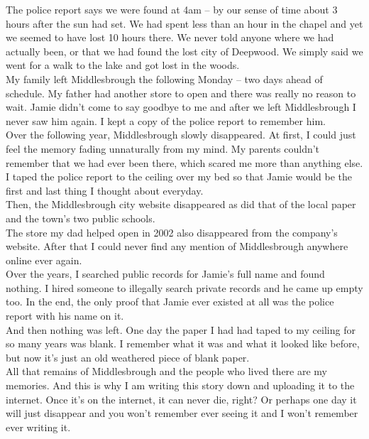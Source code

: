 \documentclass[a5paper]{scrartcl}
\begin{document}
The police report says we were found at 4am – by our sense of time about 3 hours after the sun had set. We had spent less than an hour in the chapel and yet we seemed to have lost 10 hours there. We never told anyone where we had actually been, or that we had found the lost city of Deepwood. We simply said we went for a walk to the lake and got lost in the woods. \\


My family left Middlesbrough the following Monday – two days ahead of schedule. My father had another store to open and there was really no reason to wait. Jamie didn't come to say goodbye to me and after we left Middlesbrough I never saw him again. I kept a copy of the police report to remember him.\\


Over the following year, Middlesbrough slowly disappeared. At first, I could just feel the memory fading unnaturally from my mind. My parents couldn't remember that we had ever been there, which scared me more than anything else. I taped the police report to the ceiling over my bed so that Jamie would be the first and last thing I thought about everyday.  \\


Then, the Middlesbrough city website disappeared as did that of the local paper and the town's two public schools.\\


The store my dad helped open in 2002 also disappeared from the company's website. After that I could never find any mention of Middlesbrough anywhere online ever again.\\


Over the years, I searched public records for Jamie's full name and found nothing. I hired someone to illegally search private records and he came up empty too. In the end, the only proof that Jamie ever existed at all was the police report with his name on it.\\


And then nothing was left.  One day the paper I had had taped to my ceiling for so many years was blank. I remember what it was and what it looked like before, but now it's just an old weathered piece of blank paper.\\


All that remains of Middlesbrough and the people who lived there are my memories. And this is why I am writing this story down and uploading it to the internet. Once it's on the internet, it can never die, right? Or perhaps one day it will just disappear and you won't remember ever seeing it and I won't remember ever writing it.\\
\end{document}
